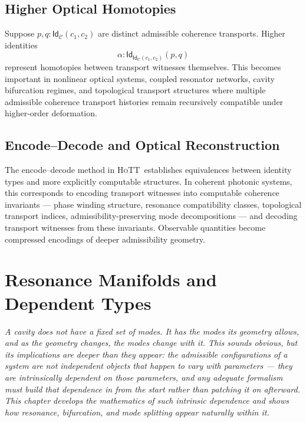 \documentclass[11pt,openany]{book}
\theoremstyle{definition}
\theoremstyle{plain}
\newcommand{\idtype}{\mathsf{Id}}
\newcommand{\HoTT}{\textsc{HoTT}}
\begin{document}
\section{Higher Optical Homotopies}

Suppose $p,q : \idtype_{\mathcal{C}}(c_1,c_2)$ are distinct admissible coherence transports. Higher identities
\[
\alpha : \idtype_{\idtype_{\mathcal{C}}(c_1,c_2)}(p,q)
\]
represent homotopies between transport witnesses themselves. This becomes important in nonlinear optical systems, coupled resonator networks, cavity bifurcation regimes, and topological transport structures where multiple admissible coherence transport histories remain recursively compatible under higher-order deformation.

\section{Encode--Decode and Optical Reconstruction}

The encode--decode method in \HoTT\ establishes equivalences between identity types and more explicitly computable structures. In coherent photonic systems, this corresponds to encoding transport witnesses into computable coherence invariants --- phase winding structure, resonance compatibility classes, topological transport indices, admissibility-preserving mode decompositions --- and decoding transport witnesses from these invariants. Observable quantities become compressed encodings of deeper admissibility geometry.


\chapter{Resonance Manifolds and Dependent Types}

\noindent\textit{A cavity does not have a fixed set of modes. It has the modes its geometry allows, and as the geometry changes, the modes change with it. This sounds obvious, but its implications are deeper than they appear: the admissible configurations of a system are not independent objects that happen to vary with parameters --- they are intrinsically dependent on those parameters, and any adequate formalism must build that dependence in from the start rather than patching it on afterward. This chapter develops the mathematics of such intrinsic dependence and shows how resonance, bifurcation, and mode splitting appear naturally within it.}
\end{document}
